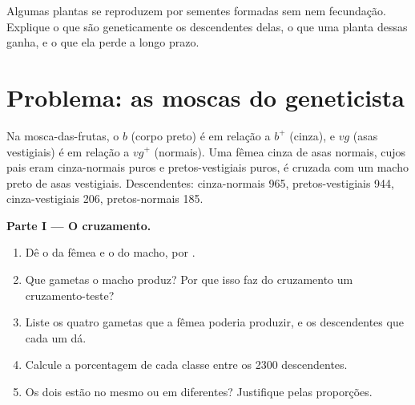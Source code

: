 \begin{exercise}[$\star\star\star$]\label{exo:g12:meiosis-genetic-shuffling:15}
Algumas plantas se reproduzem por sementes formadas sem  nem
fecundação. Explique o que são geneticamente os descendentes delas, o
que uma planta dessas ganha, e o que ela perde a longo prazo.
\end{exercise}

\section{Problema: as moscas do geneticista}

\begin{problem}
\label{pb:g12:meiosis-genetic-shuffling:1}
Na mosca-das-frutas, o  $b$ (corpo preto) é  em relação a
$b^+$ (cinza), e $vg$ (asas vestigiais) é  em relação a $vg^+$
(normais). Uma fêmea cinza de asas normais, cujos pais eram cinza-normais
puros e pretos-vestigiais puros, é cruzada com um macho preto de asas
vestigiais. Descendentes: cinza-normais 965, pretos-vestigiais 944,
cinza-vestigiais 206, pretos-normais 185.

\medskip
\noindent\textbf{Parte I --- O cruzamento.}
\begin{enumerate}
  \item Dê o  da fêmea e o do macho,  por .
  \item Que gametas o macho produz? Por que isso faz do cruzamento um
        cruzamento-teste?
  \item Liste os quatro gametas que a fêmea poderia produzir, e os
        descendentes que cada um dá.
  \item Calcule a porcentagem de cada classe entre os 2300
        descendentes.
  \item Os dois  estão no mesmo  ou em 
        diferentes? Justifique pelas proporções.
\end{enumerate}


\end{problem}
